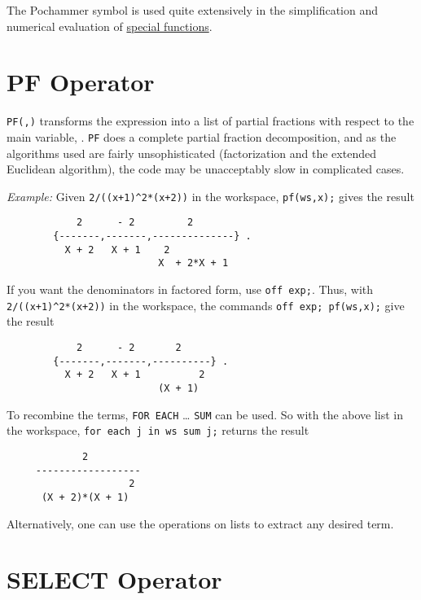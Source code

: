 The Pochammer symbol is used quite extensively in the simplification and
numerical evaluation of \hyperlink{SPECFNS}{special functions}.

\section{PF Operator}
\hypertarget{operator:PF}{}

\texttt{PF(,)} transforms the expression  into
a list of partial fractions with respect to the main variable, .
\texttt{PF}
does a complete partial fraction decomposition, and as the algorithms used
are fairly unsophisticated (factorization and the extended Euclidean
algorithm), the code may be unacceptably slow in complicated cases.

\textit{Example:}
Given \texttt{2/((x+1)\textasciicircum2*(x+2))} in the workspace,
\texttt{pf(ws,x);} gives the result
\begin{samepage}
\begin{verbatim}
            2      - 2         2
        {-------,-------,--------------} .
          X + 2   X + 1    2
                          X  + 2*X + 1
\end{verbatim}
\end{samepage}

If you want the denominators in factored form, use \texttt{off exp;}.
Thus, with \texttt{2/((x+1)\textasciicircum2*(x+2))} in the workspace,
the commands \texttt{off exp; pf(ws,x);} give the result
\begin{verbatim}
            2      - 2       2
        {-------,-------,----------} .
          X + 2   X + 1          2
                          (X + 1)
\end{verbatim}

To recombine the terms, \texttt{FOR EACH} \ldots{} \texttt{SUM} can be used.
So with the above list in the workspace,
\texttt{for each j in ws sum j;} returns the result
\begin{verbatim}
             2
     ------------------
                     2
      (X + 2)*(X + 1)
\end{verbatim}

Alternatively, one can use the operations on lists to extract any desired
term.


\section{SELECT Operator}
\hypertarget{operator:SELECT}{}

